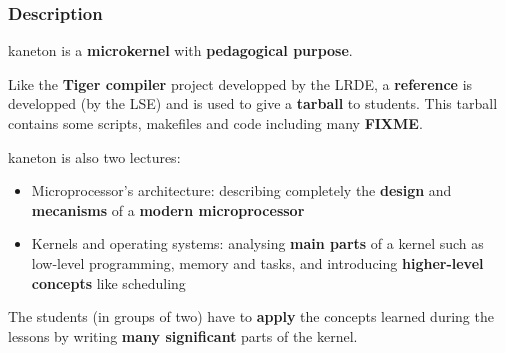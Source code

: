 
\begin{frame}
  \frametitle{Description}

  kaneton is a \textbf{microkernel} with \textbf{pedagogical purpose}.

  \-

  Like the \textbf{Tiger compiler} project developped by the LRDE, a
  \textbf{reference} is developped (by the LSE) and is used to give a
  \textbf{tarball} to students. This tarball contains some scripts,
  makefiles and code including many \textbf{FIXME}.

  \-

  kaneton is also two lectures:

  \begin{itemize}
    \item
    Microprocessor's architecture: describing completely the \textbf{design}
    and \textbf{mecanisms} of a \textbf{modern microprocessor}
    \item
    Kernels and operating systems: analysing \textbf{main parts} of a kernel
    such as low-level programming, memory and tasks, and introducing
    \textbf{higher-level concepts} like scheduling
  \end{itemize}

  \-

  The students (in groups of two) have to \textbf{apply} the concepts
  learned during the lessons by writing \textbf{many significant}
  parts of the kernel.

\end{frame}


